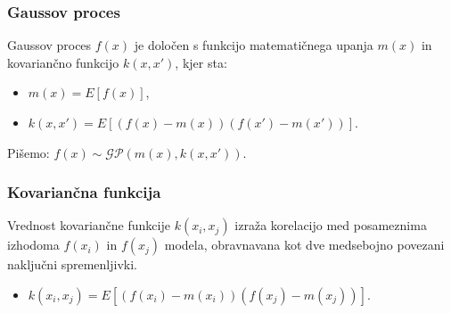 \documentclass{beamer}
\begin{document}
\begin{frame}

\frametitle{Gaussov proces}

Gaussov proces $f(x)$ je določen s funkcijo matematičnega upanja $m(x)$ in kovariančno funkcijo $k(x, x')$, kjer sta:
\begin{itemize}
\item $ m(x) = E[ f(x) ] $, 
\item $ k(x, x') = E[ (f(x) - m(x)) (f(x')-m(x')) ] $.
\end{itemize}

Pišemo: $ f(x) \sim \mathcal{GP}(m(x), k(x,x'))$.


\end{frame}

\begin{frame}

\frametitle{Kovariančna funkcija}

Vrednost kovariančne funkcije $k(x_i, x_j)$ izraža korelacijo med posameznima izhodoma $f(x_i)$ in $f(x_j)$ modela, obravnavana kot dve medsebojno povezani naključni spremenljivki. 
\begin{itemize}
\item $ k(x_i, x_j) = E[ (f(x_i) - m(x_i)) (f(x_j)-m(x_j)) ] $.
\end{itemize}




\end{frame}

\end{document}
